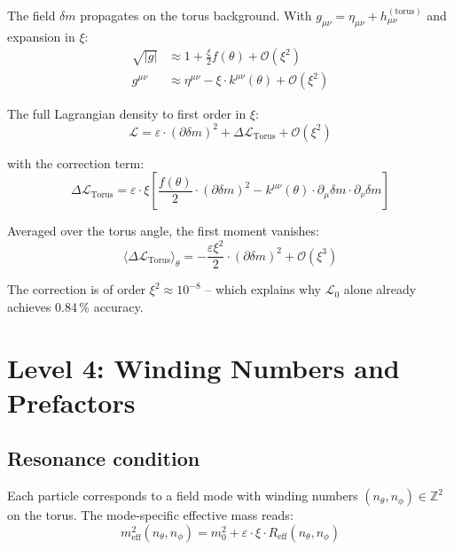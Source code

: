 The field $\delta m$ propagates on the torus background. With
$g_{\mu\nu} = \eta_{\mu\nu} + h_{\mu\nu}^{(\mathrm{torus})}$
and expansion in $\xi$:
\begin{align}
    \sqrt{|g|} &\approx 1 + \frac{\xi}{2} f(\theta) + \mathcal{O}(\xi^2) \\
    g^{\mu\nu} &\approx \eta^{\mu\nu} - \xi \cdot k^{\mu\nu}(\theta)
    + \mathcal{O}(\xi^2)
\end{align}

The full Lagrangian density to first order in $\xi$:
\begin{equation}
    \mathcal{L} = \varepsilon \cdot (\partial\delta m)^2
    + \Delta\mathcal{L}_{\mathrm{Torus}} + \mathcal{O}(\xi^2)
\end{equation}

with the correction term:
\begin{equation}
    \boxed{
    \Delta\mathcal{L}_{\mathrm{Torus}} = \varepsilon \cdot \xi \left[
    \frac{f(\theta)}{2} \cdot (\partial\delta m)^2
    - k^{\mu\nu}(\theta) \cdot \partial_\mu\delta m \cdot \partial_\nu\delta m
    \right]
    }
    \label{eq:deltaL}
\end{equation}

Averaged over the torus angle, the first moment vanishes:
\begin{equation}
    \langle \Delta\mathcal{L}_{\mathrm{Torus}} \rangle_\theta
    = -\frac{\varepsilon \xi^2}{2} \cdot (\partial\delta m)^2
    + \mathcal{O}(\xi^3)
\end{equation}

The correction is of order $\xi^2 \approx 10^{-8}$ -- which explains
why $\mathcal{L}_0$ alone already achieves 0.84\,\% accuracy.

\section{Level 4: Winding Numbers and Prefactors}

\subsection{Resonance condition}

Each particle corresponds to a field mode with winding numbers
$(n_\theta, n_\phi) \in \mathbb{Z}^2$ on the torus. The
mode-specific effective mass reads:
\begin{equation}
    m_{\mathrm{eff}}^2(n_\theta, n_\phi)
    = m_0^2 + \varepsilon \cdot \xi \cdot R_{\mathrm{eff}}(n_\theta, n_\phi)
\end{equation}

